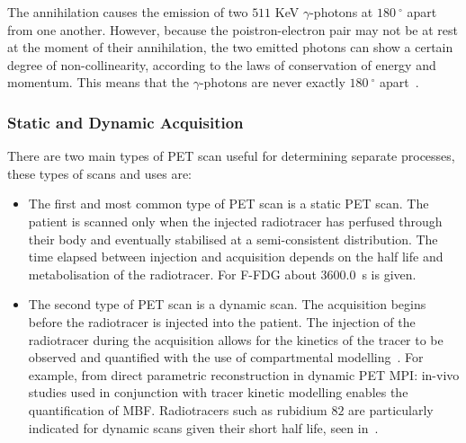                 The annihilation causes the emission of two $511$ \gls{KeV} $\gamma$-photons at $\SI{180}{^{\circ}}$ apart from one another. However, because the poistron-electron pair may not be at rest at the moment of their annihilation, the two emitted photons can show a certain degree of non-collinearity, according to the laws of conservation of energy and momentum. This means that the $\gamma$-photons are never exactly $\SI{180}{^{\circ}}$ apart~. %
            
            \subsubsection{Static and Dynamic Acquisition} \label{sec:static_and_dynamic_acquisition}
                There are two main types of \gls{PET} scan useful for determining separate processes, these types of scans and uses are:
                
                \begin{itemize}
                    \item The first and most common type of \gls{PET} scan is a static \gls{PET} scan. The patient is scanned only when the injected radiotracer has perfused through their body and eventually stabilised at a semi-consistent distribution. The time elapsed between injection and acquisition depends on the half life and metabolisation of the radiotracer. For \gls{F-FDG} about \SI{3600.0}{\second} is given.
                    
                    \item The second type of \gls{PET} scan is a dynamic scan. The acquisition begins before the radiotracer is injected into the patient. The injection of the radiotracer during the acquisition allows for the kinetics of the tracer to be observed and quantified with the use of compartmental modelling~. For example, from direct parametric reconstruction in dynamic \gls{PET} \gls{MPI}: in-vivo studies used in conjunction with tracer kinetic modelling enables the quantification of \gls{MBF}. Radiotracers such as rubidium $82$ are particularly indicated for dynamic scans given their short half life, seen in~.
                \end{itemize}
            
